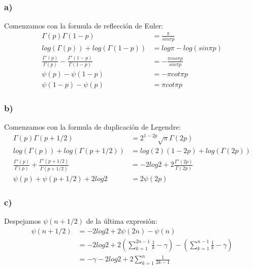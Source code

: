 \documentclass{article}
\begin{document}
\begin{tcolorbox}[breakable]
    \subsubsection*{a)}
    Comenzamos con la formula de reflección de Euler:
    \begin{align*}
        \Gamma(p)\Gamma(1-p) &= \frac{\pi}{sin\pi p} \\
        log(\Gamma(p)) + log(\Gamma(1-p)) &= log\pi - log(sin\pi p) \\
        \frac{\Gamma'(p)}{\Gamma(p)}-\frac{\Gamma'(1-p)}{\Gamma(1-p)} &= -\frac{\pi cos\pi p}{sin\pi p} \\
        \psi(p) - \psi(1-p) &= -\pi cot\pi p \\
        \psi(1-p) - \psi(p) &= \pi cot\pi p 
    \end{align*}

    \subsubsection*{b)}
    Comenzamos con la formula de duplicación de Legendre:
    \begin{align*}
        \Gamma(p)\Gamma(p+1/2) &= 2^{1-2p}\sqrt{\pi}\Gamma(2p)\\
        log(\Gamma(p))+log(\Gamma(p+1/2)) &= log(2)(1-2p) +log(\Gamma(2p)) \\
        \frac{\Gamma'(p)}{\Gamma(p)} + \frac{\Gamma'(p+1/2)}{\Gamma(p+1/2)} &= -2log2 + 2\frac{\Gamma'(2p)}{\Gamma(2p)} \\
        \psi(p) + \psi(p + 1/2) + 2log2 &= 2\psi(2p)
    \end{align*}

    \subsubsection*{c)}
    Despejamos $\psi(n+1/2)$ de la última expresión:
    \begin{align*}
        \psi(n+1/2) 
        &= - 2log2 + 2\psi(2n)-\psi(n) \\
        &= -2log2 
        + 2\left(\sum_{k=1}^{2n-1} \frac{1}{k} - \gamma \right) -\left( \sum_{k=1}^{n-1} \frac{1}{k} - \gamma \right) \\
        &= -\gamma -2log2 + 2\sum_{k=1}^{n} \frac{1}{2k-1}
    \end{align*}

\end{tcolorbox}
\end{document}
